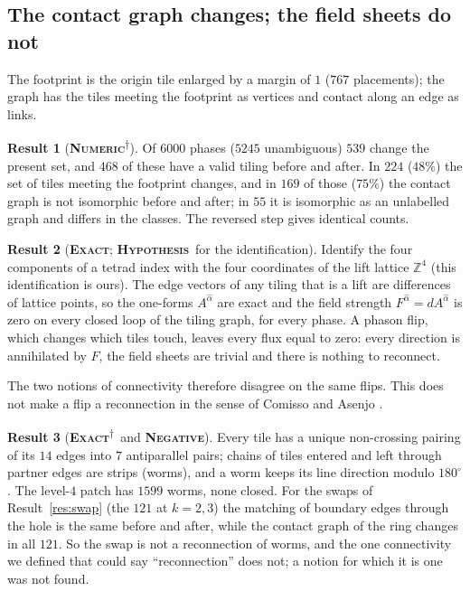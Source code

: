 \documentclass[11pt]{article}
\newcommand{\exact}{\textbf{\textsc{Exact}}}
\newcommand{\numeric}{\textbf{\textsc{Numeric}}}
\newcommand{\hypo}{\textbf{\textsc{Hypothesis}}}
\newcommand{\negres}{\textbf{\textsc{Negative}}}
\newcommand{\snap}{\textsuperscript{$\dagger$}}      %
\theoremstyle{definition}
\newtheorem{result}{Result}
\begin{document}
\subsection{The contact graph changes; the field sheets do not}\label{sec:flips-contact}
The footprint is the origin tile enlarged by a margin of $1$ ($767$ placements); the graph has the tiles meeting the footprint as vertices and contact along an edge as links.
\begin{result}[\numeric\snap]\label{res:flip-contact}
Of $6000$ phases ($5245$ unambiguous) $539$ change the present set, and $468$ of these have a valid tiling before and after. In $224$ ($48\%$) the set of tiles meeting the footprint changes, and in $169$ of those ($75\%$) the contact graph is not isomorphic before and after; in $55$ it is isomorphic as an unlabelled graph and differs in the classes. The reversed step gives identical counts.
\end{result}
\begin{result}[\exact; \hypo\ for the identification]\label{res:lift-flux}
Identify the four components of a tetrad index with the four coordinates of the lift lattice $\mathbb{Z}^4$ (this identification is ours). The edge vectors of any tiling that is a lift are differences of lattice points, so the one-forms $A^{\hat\alpha}$ are exact and the field strength $F^{\hat\alpha}=dA^{\hat\alpha}$ is zero on every closed loop of the tiling graph, for every phase. A phason flip, which changes which tiles touch, leaves every flux equal to zero: every direction is annihilated by $F$, the field sheets are trivial and there is nothing to reconnect.
\end{result}
The two notions of connectivity therefore disagree on the same flips. This does not make a flip a reconnection in the sense of Comisso and Asenjo \cite{comisso2026}.
\begin{result}[\exact\snap\ and \negres]\label{res:worms}
Every tile has a unique non-crossing pairing of its $14$ edges into $7$ antiparallel pairs; chains of tiles entered and left through partner edges are strips (worms), and a worm keeps its line direction modulo $180^\circ$. The level-$4$ patch has $1599$ worms, none closed. For the swaps of Result~\ref{res:swap} (the $121$ at $k=2,3$) the matching of boundary edges through the hole is the same before and after, while the contact graph of the ring changes in all $121$. So the swap is not a reconnection of worms, and the one connectivity we defined that could say ``reconnection'' does not; a notion for which it is one was not found.
\end{result}
\end{document}

